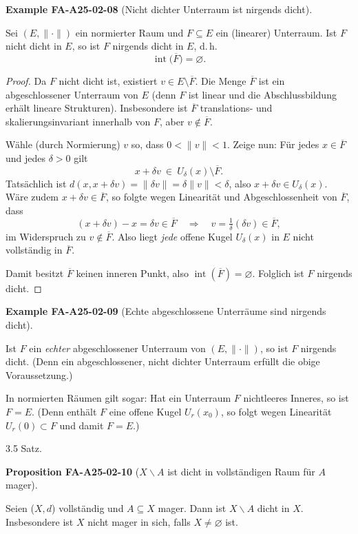 \documentclass[10pt, letterpaper]{article}
\newcommand{\CustomHeading}[3]{%
  \par\medskip\noindent%
  \textbf{#1 #2} \textnormal{(#3)}.\enskip%
}
\newenvironment{PROP}[2]{\begin{unitbox}\CustomHeading{Proposition}{#1}{#2}}{\end{unitbox}}
\newenvironment{EXA}[2]{\begin{unitbox}\CustomHeading{Example}{#1}{#2}}{\end{unitbox}}
\begin{document}
\begin{EXA}{FA-A25-02-08}{Nicht dichter Unterraum ist nirgends dicht}
Sei $(E,\|\cdot\|)$ ein normierter Raum und $F\subseteq E$ ein (linearer) Unterraum. Ist $F$ nicht dicht in $E$, so ist $F$ nirgends dicht in $E$, d.\,h.
\[
\operatorname{int}\bigl(\overline{F}\bigr)=\varnothing.
\]

\begin{proof}
Da $F$ nicht dicht ist, existiert $v\in E\setminus \overline{F}$. Die Menge $\overline{F}$ ist ein abgeschlossener Unterraum von $E$ (denn $F$ ist linear und die Abschlussbildung erhält lineare Strukturen). Insbesondere ist $\overline{F}$ translations- und skalierungsinvariant innerhalb von $F$, aber $v\notin\overline{F}$.

Wähle (durch Normierung) $v$ so, dass $0<\|v\|<1$. Zeige nun: Für jedes $x\in\overline{F}$ und jedes $\delta>0$ gilt
\[
x+\delta v\ \in\ U_\delta(x)\setminus \overline{F}.
\]
Tat­sächlich ist $d(x,x+\delta v)=\|\delta v\|=\delta\|v\|<\delta$, also $x+\delta v\in U_\delta(x)$. Wäre zudem $x+\delta v\in\overline{F}$, so folgte wegen Linearität und Abgeschlossenheit von $\overline{F}$, dass
\[
(x+\delta v)-x=\delta v\in \overline{F}
\quad\Longrightarrow\quad
v=\tfrac{1}{\delta}(\delta v)\in \overline{F},
\]
im Widerspruch zu $v\notin \overline{F}$. Also liegt \emph{jede} offene Kugel $U_\delta(x)$ in $E$ nicht vollständig in $\overline{F}$.

Damit besitzt $\overline{F}$ keinen inneren Punkt, also $\operatorname{int}(\overline{F})=\varnothing$. Folglich ist $F$ nirgends dicht.
\end{proof}
\end{EXA}


\begin{EXA}{FA-A25-02-09}{Echte abgeschlossene Unterräume sind nirgends dicht}
Ist $F$ ein \emph{echter} abgeschlossener Unterraum von $(E,\|\cdot\|)$, so ist $F$ nirgends dicht. (Denn ein abgeschlossener, nicht dichter Unterraum erfüllt die obige Voraussetzung.)
\end{EXA}



In normierten Räumen gilt sogar: Hat ein Unterraum $F$ nichtleeres Inneres, so ist $F=E$. (Denn enthält $F$ eine offene Kugel $U_r(x_0)$, so folgt wegen Linearität $U_r(0)\subset F$ und damit $F=E$.)


3.5 Satz. 

\begin{PROP}{FA-A25-02-10}{$X\backslash A$ ist dicht in vollständigen Raum für $A$ mager}
Seien ($X,d$) vollständig und $A \subseteq X$ mager. Dann ist $X \backslash A$ dicht in $X$. Insbesondere ist $X$ nicht mager in sich, falls $X \neq \varnothing$ ist.
\end{PROP}
\end{document}
